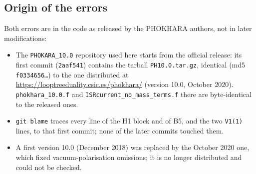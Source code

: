 \documentclass[11pt,a4paper]{article}
\newcommand{\code}[1]{\texttt{#1}}
\newcommand{\phok}{PHOKHARA}
\begin{document}
\subsection{Origin of the errors}
\label{sec:origin}
Both errors are in the code as released by the \phok{} authors, not in later modifications:
\begin{itemize}
\item The \code{PHOKARA\_10.0} repository used here starts from the official release: its first
  commit (\code{2aaf541}) contains the tarball \code{PH10.0.tar.gz}, identical (md5
  \code{f0334656\ldots}) to the one distributed at
  \url{https://looptreeduality.csic.es/phokhara/} (version 10.0, October 2020). \code{phokhara\_10.0.f}
  and \code{ISRcurrent\_no\_mass\_terms.f} there are byte-identical to the released ones.
\item \code{git blame} traces every line of the H1 block and of B5, and the two \code{V1(1)}
  lines, to that first commit; none of the later commits touched them.
\item A first version 10.0 (December 2018) was replaced by the October 2020 one, which fixed
  vacuum-polarisation omissions; it is no longer distributed and could not be checked.
\end{itemize}
\end{document}
